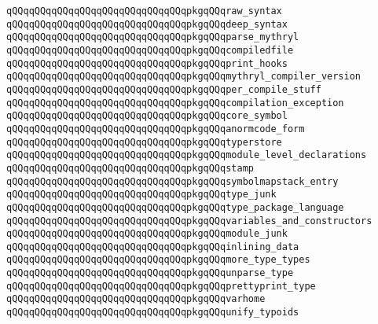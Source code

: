 \verb|qQQqqQQqqQQqqQQqqQQqqQQqqQQqqQQqpkgqQQqraw_syntax|\newline
\verb|qQQqqQQqqQQqqQQqqQQqqQQqqQQqqQQqpkgqQQqdeep_syntax|\newline
\verb|qQQqqQQqqQQqqQQqqQQqqQQqqQQqqQQqpkgqQQqparse_mythryl|\newline
\verb|qQQqqQQqqQQqqQQqqQQqqQQqqQQqqQQqpkgqQQqcompiledfile|\newline
\verb|qQQqqQQqqQQqqQQqqQQqqQQqqQQqqQQqpkgqQQqprint_hooks|\newline
\verb|qQQqqQQqqQQqqQQqqQQqqQQqqQQqqQQqpkgqQQqmythryl_compiler_version|\newline
\verb|qQQqqQQqqQQqqQQqqQQqqQQqqQQqqQQqpkgqQQqper_compile_stuff|\newline
\verb|qQQqqQQqqQQqqQQqqQQqqQQqqQQqqQQqpkgqQQqcompilation_exception|\newline
\verb|qQQqqQQqqQQqqQQqqQQqqQQqqQQqqQQqpkgqQQqcore_symbol|\newline
\verb|qQQqqQQqqQQqqQQqqQQqqQQqqQQqqQQqpkgqQQqanormcode_form|\newline
\newline
\verb|qQQqqQQqqQQqqQQqqQQqqQQqqQQqqQQqpkgqQQqtyperstore|\newline
\verb|qQQqqQQqqQQqqQQqqQQqqQQqqQQqqQQqpkgqQQqmodule_level_declarations|\newline
\verb|qQQqqQQqqQQqqQQqqQQqqQQqqQQqqQQqpkgqQQqstamp|\newline
\verb|qQQqqQQqqQQqqQQqqQQqqQQqqQQqqQQqpkgqQQqsymbolmapstack_entry|\newline
\verb|qQQqqQQqqQQqqQQqqQQqqQQqqQQqqQQqpkgqQQqtype_junk|\newline
\verb|qQQqqQQqqQQqqQQqqQQqqQQqqQQqqQQqpkgqQQqtype_package_language|\newline
\verb|qQQqqQQqqQQqqQQqqQQqqQQqqQQqqQQqpkgqQQqvariables_and_constructors|\newline
\verb|qQQqqQQqqQQqqQQqqQQqqQQqqQQqqQQqpkgqQQqmodule_junk|\newline
\verb|qQQqqQQqqQQqqQQqqQQqqQQqqQQqqQQqpkgqQQqinlining_data|\newline
\verb|qQQqqQQqqQQqqQQqqQQqqQQqqQQqqQQqpkgqQQqmore_type_types|\newline
\verb|qQQqqQQqqQQqqQQqqQQqqQQqqQQqqQQqpkgqQQqunparse_type|\newline
\verb|qQQqqQQqqQQqqQQqqQQqqQQqqQQqqQQqpkgqQQqprettyprint_type|\newline
\verb|qQQqqQQqqQQqqQQqqQQqqQQqqQQqqQQqpkgqQQqvarhome|\newline
\verb|qQQqqQQqqQQqqQQqqQQqqQQqqQQqqQQqpkgqQQqunify_typoids|\newline
